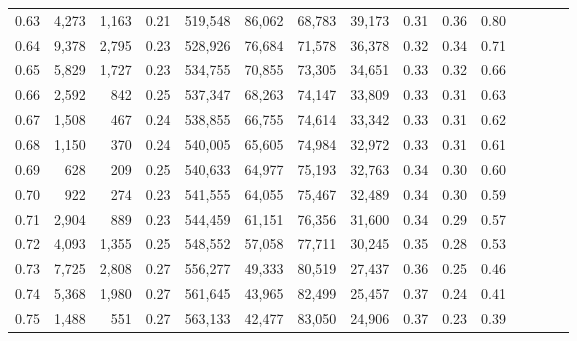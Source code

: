 \begin{tabular}{rrrcrrrrrrrrrrr}
0.63 &   4,273 &   1,163 &                                       0.21 &  519,548 &   86,062 &   68,783 &   39,173 &  0.31 &  0.36 &                         0.80 \\
0.64 &   9,378 &   2,795 &                                       0.23 &  528,926 &   76,684 &   71,578 &   36,378 &  0.32 &  0.34 &                         0.71 \\
0.65 &   5,829 &   1,727 &                                       0.23 &  534,755 &   70,855 &   73,305 &   34,651 &  0.33 &  0.32 &                         0.66 \\
0.66 &   2,592 &     842 &                                       0.25 &  537,347 &   68,263 &   74,147 &   33,809 &  0.33 &  0.31 &                         0.63 \\
0.67 &   1,508 &     467 &                                       0.24 &  538,855 &   66,755 &   74,614 &   33,342 &  0.33 &  0.31 &                         0.62 \\
0.68 &   1,150 &     370 &                                       0.24 &  540,005 &   65,605 &   74,984 &   32,972 &  0.33 &  0.31 &                         0.61 \\
0.69 &     628 &     209 &                                       0.25 &  540,633 &   64,977 &   75,193 &   32,763 &  0.34 &  0.30 &                         0.60 \\
0.70 &     922 &     274 &                                       0.23 &  541,555 &   64,055 &   75,467 &   32,489 &  0.34 &  0.30 &                         0.59 \\
0.71 &   2,904 &     889 &                                       0.23 &  544,459 &   61,151 &   76,356 &   31,600 &  0.34 &  0.29 &                         0.57 \\
0.72 &   4,093 &   1,355 &                                       0.25 &  548,552 &   57,058 &   77,711 &   30,245 &  0.35 &  0.28 &                         0.53 \\
0.73 &   7,725 &   2,808 &                                       0.27 &  556,277 &   49,333 &   80,519 &   27,437 &  0.36 &  0.25 &                         0.46 \\
0.74 &   5,368 &   1,980 &                                       0.27 &  561,645 &   43,965 &   82,499 &   25,457 &  0.37 &  0.24 &                         0.41 \\
0.75 &   1,488 &     551 &                                       0.27 &  563,133 &   42,477 &   83,050 &   24,906 &  0.37 &  0.23 &                         0.39 \\

\end{tabular}
